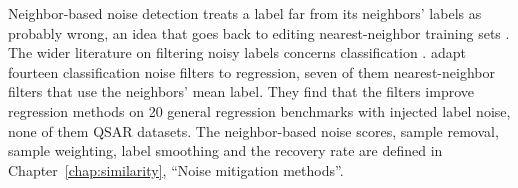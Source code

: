 %
Neighbor-based noise detection treats a label far from its neighbors' labels as probably wrong, an idea that goes back to editing nearest-neighbor training sets \citep{Wilson1972}. The wider literature on filtering noisy labels concerns classification \citep{Brodley1999, frenay2014classification}. \citet{Martin2021} adapt fourteen classification noise filters to regression, seven of them nearest-neighbor filters that use the neighbors' mean label. They find that the filters improve regression methods on 20 general regression benchmarks with injected label noise, none of them QSAR datasets.
The neighbor-based noise scores, sample removal, sample weighting, label smoothing and the recovery rate are defined in Chapter~\ref{chap:similarity}, ``Noise mitigation methods''.

